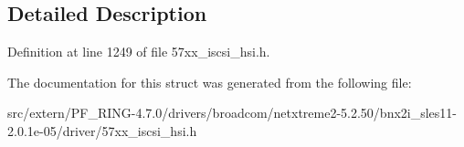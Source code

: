 \subsection{Detailed Description}


Definition at line 1249 of file 57xx\_\-iscsi\_\-hsi.h.



The documentation for this struct was generated from the following file:\begin{DoxyCompactItemize}
\item 
src/extern/PF\_\-RING-\/4.7.0/drivers/broadcom/netxtreme2-\/5.2.50/bnx2i\_\-sles11-\/2.0.1e-\/05/driver/57xx\_\-iscsi\_\-hsi.h\end{DoxyCompactItemize}
